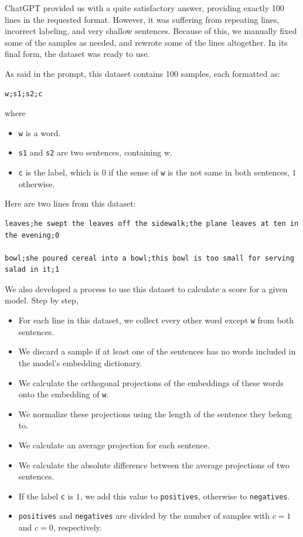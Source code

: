 ChatGPT provided us with a quite satisfactory answer, providing exactly 100 lines in the requested format. However, it was suffering from repeating lines, incorrect labeling, and very shallow sentences. Because of this, we manually fixed some of the samples as needed, and rewrote some of the lines altogether. In its final form, the dataset was ready to use.

As said in the prompt, this dataset contains 100 samples, each formatted as:

\begin{verbatim}
w;s1;s2;c
\end{verbatim}

\noindent
where

\begin{itemize}
    \item \verb|w| is a word.
    \item \verb|s1| and \verb|s2| are two sentences, containing w.
    \item \verb|c| is the label, which is $0$ if the sense of \verb|w| is the not same in both sentences, $1$ otherwise.
\end{itemize}

Here are two lines from this dataset:

\begin{lstlisting}[numbers=none, caption=Examples from Sense-Contrast Dataset]
leaves;he swept the leaves off the sidewalk;the plane leaves at ten in the evening;0

bowl;she poured cereal into a bowl;this bowl is too small for serving salad in it;1
\end{lstlisting}

We also developed a process to use this dataset to calculate a score for a given model. Step by step,

\begin{itemize}
    \item For each line in this dataset, we collect every other word except \verb|w| from both sentences.
    \item We discard a sample if at least one of the sentences has no words included in the model's embedding dictionary.
    \item We calculate the orthogonal projections of the embeddings of these words onto the embedding of \verb|w|.
    \item We normalize these projections using the length of the sentence they belong to.
    \item We calculate an average projection for each sentence.
    \item We calculate the absolute difference between the average projections of two sentences. 
    \item If the label \verb|c| is $1$, we add this value to \verb|positives|, otherwise to \verb|negatives|.
    \item \verb|positives| and \verb|negatives| are divided by the number of samples with $c=1$ and $c=0$, respectively.
\end{itemize}

